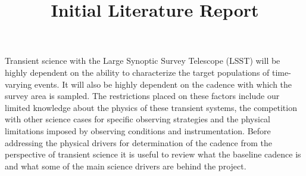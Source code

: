 \documentclass[11pt]{article}
\title{Initial Literature Report}
\begin{document}
\par
\vspace{7pt}
Transient science with the Large Synoptic Survey Telescope (LSST) will be highly dependent on the ability to characterize the target populations of time-varying events. It will also be highly dependent on the cadence with which the survey area is sampled. The restrictions placed on these factors include our limited knowledge about the physics of these transient systems, the competition with other science cases for specific observing strategies and the physical limitations imposed by observing conditions and instrumentation. Before addressing the physical drivers for determination of the cadence from the perspective of transient science it is useful to review what the baseline cadence is and what some of the main science drivers are behind the project. \par
\end{document}
